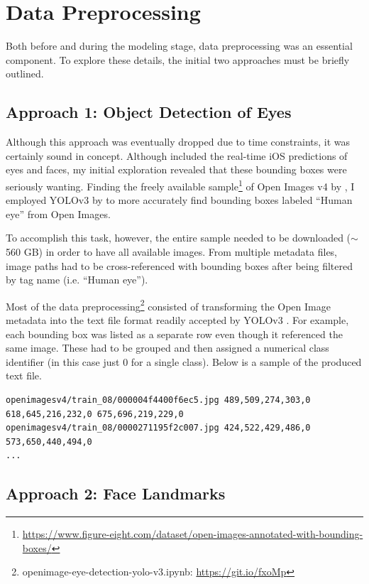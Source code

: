 \documentclass[aip, rsi, amsmath, amssymb, reprint, author-year, longbibliography]{revtex4-1}
\begin{document}
\section{\label{sec:level1}Data Preprocessing}

Both before and during the modeling stage, data preprocessing was an essential
component. To explore these details, the initial two approaches must be briefly outlined.

\subsection{\label{sec:level2} Approach 1: Object Detection of Eyes}

Although this approach was eventually dropped due to time constraints, it was
certainly sound in concept. Although \cite{7780608} included the real-time iOS
predictions of eyes and faces, my initial exploration revealed that these
bounding boxes were seriously wanting. Finding the freely available
sample\footnote{\url{https://www.figure-eight.com/dataset/open-images-annotated-with-bounding-boxes/}}
of Open Images v4 by \cite{openimages}, I employed YOLOv3 by \cite{yolov3} to
more accurately find bounding boxes labeled ``Human eye'' from Open Images.

To accomplish this task, however, the entire sample needed to be downloaded
($\sim$560 GB) in order to have all available images. From multiple
metadata files, image paths had to be cross-referenced with bounding boxes after
being filtered by tag name (i.e. ``Human eye'').

Most of the data
preprocessing\footnote{openimage-eye-detection-yolo-v3.ipynb: \url{https://git.io/fxoMp}}
consisted of transforming the Open Image metadata into the text file format
readily accepted by YOLOv3 \citep{yolov3}. For example, each bounding box was
listed as a separate row even though it referenced the same image. These had to
be grouped and then assigned a numerical class identifier (in this case just 0
for a single class). Below is a sample of the produced text file.

\begin{lstlisting}
openimagesv4/train_08/000004f4400f6ec5.jpg 489,509,274,303,0 618,645,216,232,0 675,696,219,229,0
openimagesv4/train_08/0000271195f2c007.jpg 424,522,429,486,0 573,650,440,494,0
...
\end{lstlisting}

\subsection{\label{sec:level2} Approach 2: Face Landmarks}
\end{document}
